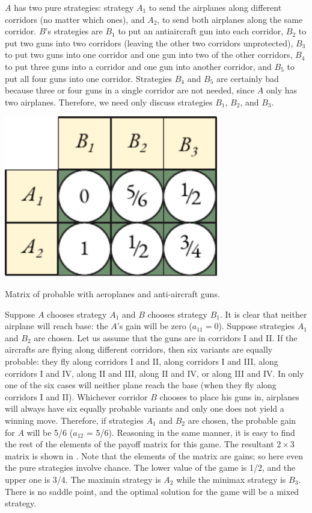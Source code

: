 $A$ has two pure strategies: strategy $A_{1}$ to send the airplanes along
different corridors (no matter which ones), and $A_{2}$, to send both
airplanes along the same corridor. $B$'s strategies are $B_{1}$ to put an
antiaircraft gun into each corridor, $B_{2}$ to put two guns into two
corridors (leaving the other two corridors unprotected), $B_{3}$ to put two
guns into one corridor and one gun into two of the other corridors, $B_{4}$
to put three guns into a corridor and one gun into another corridor,
and $B_{5}$ to put all four guns into one corridor. Strategies $B_{4}$ and $B_{5}$ are certainly bad because three or four guns in a single corridor are not
needed, since $A$ only has two airplanes. Therefore, we need only discuss
strategies $B_{1}$, $B_{2}$, and $B_{3}$.

 \begin{marginfigure}[-2cm]%
 \centering
 \includegraphics[width=0.7\textwidth]{figures/aa-matrix.pdf}
\caption{Matrix of probable with aeroplanes and anti-aircraft guns.\label{aa-matrix}}
 \end{marginfigure}
Suppose $A$ chooses strategy $A_{1}$ and $B$ chooses strategy $B_{1}$. It is clear that neither airplane will reach base: the $A$'s gain will be zero ($a_{11}=0$). Suppose strategies $A_{1}$ and $B_{2}$ are chosen. Let us assume that the guns are in corridors I and II. If the aircrafts are flying along different corridors, then six variants are equally probable: they fly along corridors I and II, along corridors I and III, along corridors I and IV, along II and III, along II and IV, or along III and IV. In only one of the six cases will neither plane reach the base (when they fly along corridors I and II). Whichever corridor $B$ chooses to place his guns in, airplanes will always have six equally probable variants and only one does not yield a winning move. Therefore, if strategies $A_{1}$ and 
$B_{2}$ are chosen, the probable gain for $A$ will be 5/6 ($a_{12}$ = 5/6). Reasoning in the same manner, it is easy to find the rest of the elements of the
payoff matrix for this game. The resultant $2 \times 3$ matrix is shown in
. Note that the elements of the matrix are  gains; so here even the pure strategies involve chance. The lower value of the
game is 1/2, and the upper one is 3/4. The maximin strategy is $A_{2}$ while
the minimax strategy is $B_{3}$. There is no saddle point, and the optimal
solution for the game will be a mixed strategy.

